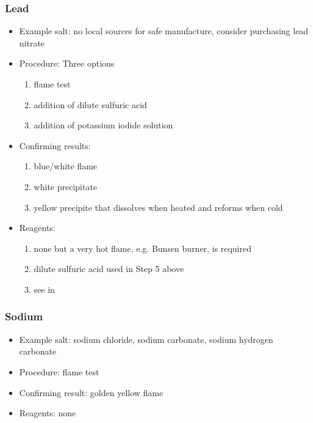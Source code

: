 \subsubsection{Lead}
\begin{itemize}
\item{Example salt: no local sources for safe manufacture, 
consider purchasing lead nitrate}

\item{Procedure: Three options
\begin{enumerate}
\item{flame test} 
\item{addition of dilute sulfuric acid}
\item{addition of potassium iodide solution}
\end{enumerate}
} %

\item{Confirming results:
\begin{enumerate}
\item{blue/white flame}
\item{white precipitate}
\item{yellow precipite that dissolves when heated and reforms when cold}
\end{enumerate}
} %

\item{Reagents:
\begin{enumerate}
\item{none but a very hot flame, e.g. Bunsen burner, is required} 
\item{dilute sulfuric acid used in Step 5 above}
\item{see  in }
\end{enumerate}
} %

\end{itemize} %

\subsubsection{Sodium}
\begin{itemize}
\item{Example salt: sodium chloride, 
sodium carbonate, 
sodium hydrogen carbonate}
\item{Procedure: flame test}
\item{Confirming result: golden yellow flame}
\item{Reagents: none}
\end{itemize}

